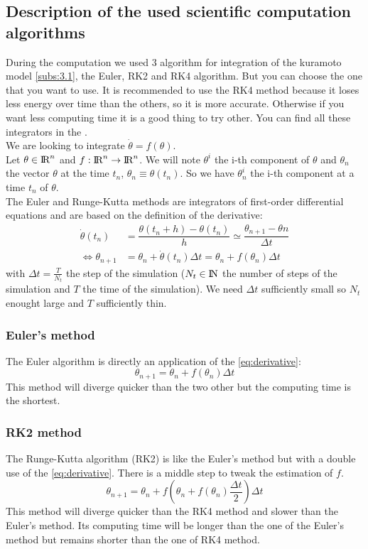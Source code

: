 \documentclass[1pt, a4paper]{article}
\begin{document}
\subsection{Description of the used scientific computation algorithms}
\label{subs:3.2}
During the computation we used 3 algorithm for integration of the kuramoto model \ref{subs:3.1}, the Euler, RK2 and RK4 algorithm. But you can choose the one that you want to use. It is recommended to use the RK4 method because it loses less energy over time than the others, so it is more accurate. Otherwise if you want less computing time it is a good thing to try other. You can find all these integrators in the .\\
We are looking to integrate $\dot{\theta} = f(\theta)$.\\
Let $\theta\in\mbox{I\hspace{-.15em}R}^n$ and $f:\mbox{I\hspace{-.15em}R}^n  \rightarrow  \mbox{I\hspace{-.15em}R}^n$. We will note $\theta^i$ the i-th component of $\theta$ and $\theta_n$ the vector $\theta$ at the time $t_n$, $\theta_n \equiv \theta(t_n)$. So we have $\theta^i_n$ the i-th component at a time $t_n$ of $\theta$.\\
The Euler and Runge-Kutta methods are integrators of first-order differential equations and are based on the definition of the derivative:
\begin{equation}
\label{eq:derivative}
    \begin{aligned}
        \dot{\theta}(t_n) &= \dfrac{\theta(t_n + h) - \theta(t_n)}{h}\simeq\dfrac{\theta_{n+1} - \theta{n}}{\Delta t}\\
        \iff \theta_{n+1} &= \theta_n + \dot{\theta}(t_n)\Delta t = \theta_n + f(\theta_n)\Delta t
    \end{aligned}
\end{equation}
with $\Delta t = \frac{T}{N_t}$ the step of the simulation ($N_t\in\mbox{I\hspace{-.15em}N}$ the number of steps of the simulation and $T$ the time of the simulation). We need $\Delta t$ sufficiently small so $N_t$ enought large and $T$ sufficiently thin.
\subsubsection{Euler's method}
\label{subsubs:Euler}
The Euler algorithm is directly an application of the \autoref{eq:derivative}:
\begin{equation}
    \theta_{n+1} = \theta_n + f(\theta_n)\Delta t
\end{equation}
This method will diverge quicker than the two other but the computing time is the shortest.
\newpage
\subsubsection{RK2 method}
\label{subsubs:RK2}
The Runge-Kutta algorithm (RK2) is like the Euler's method but with a double use of the \autoref{eq:derivative}. There is a middle step to tweak the estimation of $f$.
\begin{equation}
    \theta_{n+1} = \theta_n + f(\theta_n + f(\theta_n)\dfrac{\Delta t}{2})\Delta t
\end{equation}
This method will diverge quicker than the RK4 method and slower than the Euler's method. Its computing time will be longer than the one of the Euler's method but remains shorter than the one of RK4 method.
\end{document}
